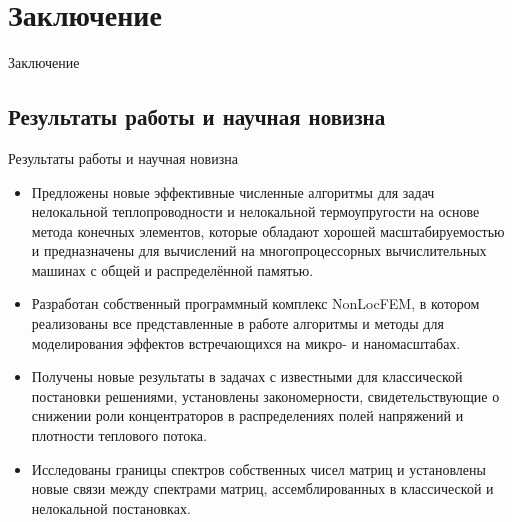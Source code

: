\section{Заключение}

\begin{frame}
	\centering
	\Huge
	Заключение
\end{frame}


\subsection{Результаты работы и научная новизна}
\begin{frame}{Результаты работы и научная новизна}
    \begin{itemize}
        \item Предложены новые эффективные численные алгоритмы для задач нелокальной теплопроводности и нелокальной термоупругости на основе метода конечных элементов, которые обладают хорошей масштабируемостью и предназначены для вычислений на многопроцессорных вычислительных машинах с общей и распределённой памятью.
        \item Разработан собственный программный комплекс NonLocFEM, в котором реализованы все представленные в работе алгоритмы и методы для моделирования эффектов встречающихся на микро- и наномасштабах.
        \item Получены новые результаты в задачах с известными для классической постановки решениями, установлены закономерности, свидетельствующие о снижении роли концентраторов в распределениях полей напряжений и плотности теплового потока.
        \item Исследованы границы спектров собственных чисел матриц и установлены новые связи между спектрами матриц, ассемблированных в классической и нелокальной постановках.
    \end{itemize}
\end{frame}

